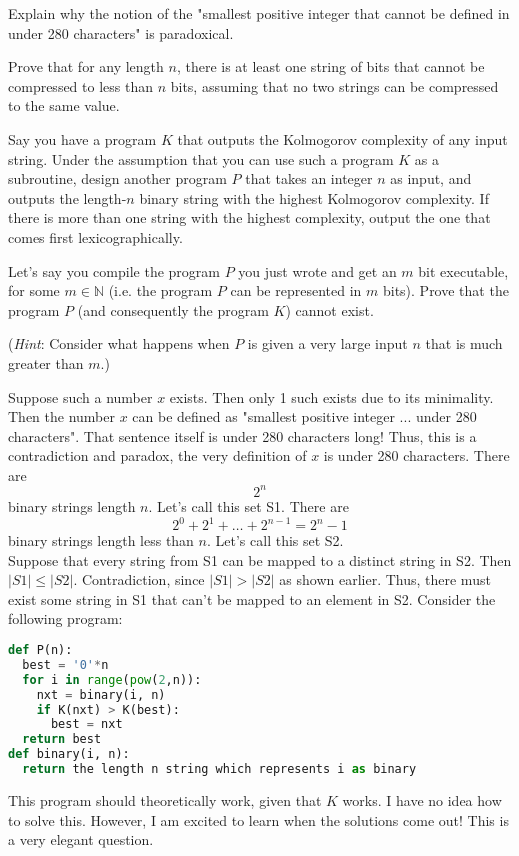 \documentclass[11pt]{article}
\begin{document}
\begin{Parts}

\Part
Explain why the notion of the "smallest positive integer that cannot be defined in under 280 characters" is paradoxical.


\Part
Prove that for any length $n$, there is at least one string of bits that cannot be compressed to less than $n$ bits, assuming that no two strings can be compressed to the same value.


\Part
Say you have a program $K$ that outputs the Kolmogorov complexity of any input
string. Under the assumption that you can use such a program $K$ as a
subroutine, design another program $P$ that takes an integer $n$ as input, and
outputs the length-$n$ binary string with the highest Kolmogorov complexity. If
there is more than one string with the highest complexity, output the one that
comes first lexicographically.


\Part
Let's say you compile the program $P$ you just wrote and get an $m$ bit
executable, for some $m \in \mathbb N$ (i.e. the program $P$ can be represented
in $m$ bits). Prove that the program $P$ (and consequently the program $K$)
cannot exist.

(\textit{Hint}: Consider what happens when $P$ is given a very large input $n$ that is much greater than $m$.)

 


\end{Parts}
\begin{solution}
\begin{Parts}
\Part Suppose such a number $x$ exists. Then only 1 such exists due to its minimality.
Then the number $x$ can be defined as "smallest positive integer ... under 280 characters".
That sentence itself is under 280 characters long!
Thus, this is a contradiction and paradox, the very definition of $x$ is under 280 characters.
\Part There are $$2^n$$ binary strings length $n$. Let's call this set S1.
There are $$2^0+2^1+\dots+2^{n-1}=2^n-1$$ binary strings length less than $n$. Let's call this set S2.
\\Suppose that every string from S1 can be mapped to a distinct string in S2.
Then $|S1|\leq|S2|$. Contradiction, since $|S1|>|S2|$ as shown earlier.
Thus, there must exist some string in S1 that can't be mapped to an element in S2.
\Part 
Consider the following program:
\begin{lstlisting}[language=Python]
def P(n):
  best = '0'*n
  for i in range(pow(2,n)):
    nxt = binary(i, n)
    if K(nxt) > K(best):
      best = nxt
  return best
def binary(i, n):
  return the length n string which represents i as binary
\end{lstlisting}
This program should theoretically work, given that $K$ works.
\Part I have no idea how to solve this. However, I am excited to learn when the solutions come out!
This is a very elegant question.
\end{Parts}
\end{solution}
\newpage
\end{document}
